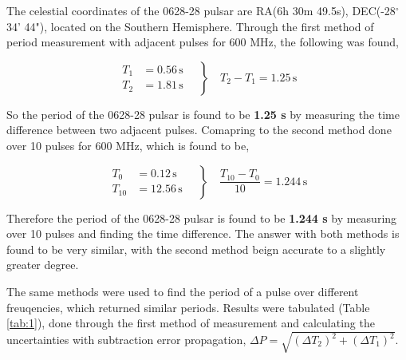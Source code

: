 \documentclass[12pt]{article}
\begin{document}
The celestial coordinates of the 0628-28 pulsar are RA(6h 30m 49.5s), DEC(-28$^{\circ}$ 34' 44"), located on the Southern Hemisphere. Through the first method of period measurement with adjacent pulses for 600 MHz, the following was found,

\vspace{-2ex}
\[
\left.
\begin{aligned}
T_1 &= 0.56\,\text{s} \\
T_2 &= 1.81\,\text{s}
\end{aligned}
\quad \right\}
\quad T_2 - T_1 = 1.25\,\text{s}
\]

So the period of the 0628-28 pulsar is found to be \textbf{1.25 s} by measuring the time difference between two adjacent pulses. Comapring to the second method done over 10 pulses for 600 MHz, which is found to be,

\vspace{-2ex}
\[
\left.
\begin{aligned}
T_0 &= 0.12\,\text{s} \\
T_{10} &= 12.56\,\text{s}
\end{aligned}
\quad \right\}
\quad \frac{T_{10} - T_0}{10} = 1.244\,\text{s}
\]

Therefore the period of the 0628-28 pulsar is found to be \textbf{1.244 s} by measuring over 10 pulses and finding the time difference. The answer with both methods is found to be very similar, with the second method beign accurate to a slightly greater degree.

The same methods were used to find the period of a pulse over different freuqencies, which returned similar periods. Results were tabulated (Table \ref{tab:1}), done through the first method of measurement and calculating the uncertainties with subtraction error propagation, $\Delta P = \sqrt{(\Delta T_2)^2 + (\Delta T_1)^2}$.

\begin{table}[H]
    \centering
    \caption{Table of 0628-28 pulsar periods with uncertainties.}
    \label{tab:1}
\end{table}
\end{document}
